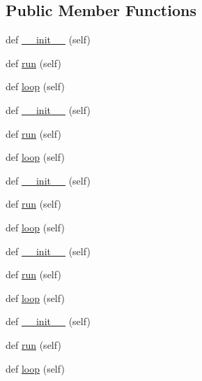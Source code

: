 \subsection*{Public Member Functions}
\begin{DoxyCompactItemize}
\item 
def \hyperlink{classwaflib_1_1_runner_1_1_task_consumer_a01d759a15eeef356a7fce59ad8da5163}{\+\_\+\+\_\+init\+\_\+\+\_\+} (self)
\item 
def \hyperlink{classwaflib_1_1_runner_1_1_task_consumer_adb9994d172520af3e4ef4399cbc60e37}{run} (self)
\item 
def \hyperlink{classwaflib_1_1_runner_1_1_task_consumer_a871409c4e8e65c015c8d94c85ebce50c}{loop} (self)
\item 
def \hyperlink{classwaflib_1_1_runner_1_1_task_consumer_a01d759a15eeef356a7fce59ad8da5163}{\+\_\+\+\_\+init\+\_\+\+\_\+} (self)
\item 
def \hyperlink{classwaflib_1_1_runner_1_1_task_consumer_adb9994d172520af3e4ef4399cbc60e37}{run} (self)
\item 
def \hyperlink{classwaflib_1_1_runner_1_1_task_consumer_a871409c4e8e65c015c8d94c85ebce50c}{loop} (self)
\item 
def \hyperlink{classwaflib_1_1_runner_1_1_task_consumer_a01d759a15eeef356a7fce59ad8da5163}{\+\_\+\+\_\+init\+\_\+\+\_\+} (self)
\item 
def \hyperlink{classwaflib_1_1_runner_1_1_task_consumer_adb9994d172520af3e4ef4399cbc60e37}{run} (self)
\item 
def \hyperlink{classwaflib_1_1_runner_1_1_task_consumer_a871409c4e8e65c015c8d94c85ebce50c}{loop} (self)
\item 
def \hyperlink{classwaflib_1_1_runner_1_1_task_consumer_a01d759a15eeef356a7fce59ad8da5163}{\+\_\+\+\_\+init\+\_\+\+\_\+} (self)
\item 
def \hyperlink{classwaflib_1_1_runner_1_1_task_consumer_adb9994d172520af3e4ef4399cbc60e37}{run} (self)
\item 
def \hyperlink{classwaflib_1_1_runner_1_1_task_consumer_a871409c4e8e65c015c8d94c85ebce50c}{loop} (self)
\item 
def \hyperlink{classwaflib_1_1_runner_1_1_task_consumer_a01d759a15eeef356a7fce59ad8da5163}{\+\_\+\+\_\+init\+\_\+\+\_\+} (self)
\item 
def \hyperlink{classwaflib_1_1_runner_1_1_task_consumer_adb9994d172520af3e4ef4399cbc60e37}{run} (self)
\item 
def \hyperlink{classwaflib_1_1_runner_1_1_task_consumer_a871409c4e8e65c015c8d94c85ebce50c}{loop} (self)

\end{DoxyCompactItemize}
